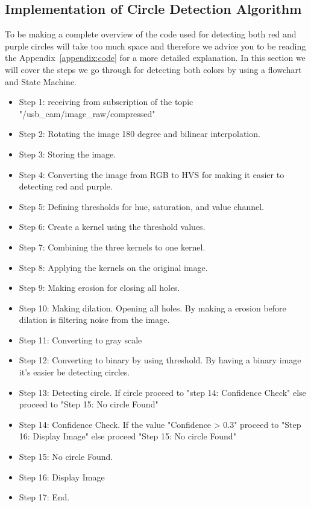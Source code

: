 \documentclass{article}
\begin{document}
	\subsection{Implementation of Circle Detection Algorithm}
	To be making a complete overview of the code used for detecting both red and purple circles will take too much space and therefore we advice you to be reading the Appendix~\ref{appendix:code} for a more detailed explanation. In this section we will cover the steps we go through for detecting both colors by using a flowchart and State Machine.
	\begin{itemize}
		\item Step 1: receiving from subscription of the topic "/usb\_cam/image\_raw/compressed"
		
		\item Step 2: Rotating the image 180 degree and bilinear interpolation.
		
		\item Step 3: Storing the image.
		
		\item Step 4: Converting the image from RGB to HVS for making it easier to detecting red and purple.
		
		\item Step 5: Defining thresholds for hue, saturation, and value channel.
		
		\item Step 6: Create a kernel using the threshold values.
		
		\item Step 7: Combining the three kernels to one kernel.
		
		\item Step 8: Applying the kernels on the original image.
		
		\item Step 9: Making erosion for closing all holes.
		
		\item Step 10: Making dilation. Opening all holes. By making a erosion before dilation is filtering noise from the image.
		
		\item Step 11: Converting to gray scale
		
		\item Step 12: Converting to binary by using threshold. By having a binary image it's easier be detecting circles.
		
		\item Step 13: Detecting circle. If circle proceed to "step 14: Confidence Check" else proceed to "Step 15: No circle Found"
		
		\item Step 14: Confidence Check. If the value "Confidence > 0.3" proceed to "Step 16: Display Image" else proceed "Step 15: No circle Found"
		
		\item Step 15: No circle Found.
		
		\item Step 16: Display Image
		
		\item Step 17: End.
	\end{itemize}
\end{document}
